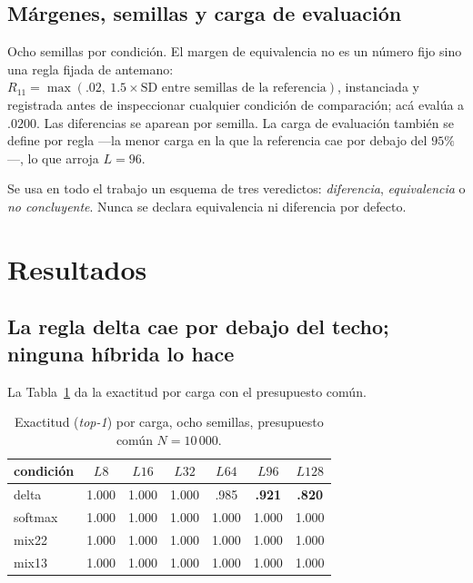 \documentclass[jou,11pt,donotrepeattitle]{apa7}
\begin{document}
\subsection{M\'argenes, semillas y carga de evaluaci\'on}

Ocho semillas por condici\'on. El margen de equivalencia no es un n\'umero fijo sino una regla
fijada de antemano: $R_{11} = \max(.02,\ 1.5\times \text{SD entre semillas de la referencia})$,
instanciada y registrada antes de inspeccionar cualquier condici\'on de comparaci\'on; ac\'a
eval\'ua a $.0200$. Las diferencias se aparean por semilla. La carga de evaluaci\'on tambi\'en
se define por regla ---la menor carga en la que la referencia cae por debajo del $95\%$---, lo
que arroja $L=96$.

Se usa en todo el trabajo un esquema de tres veredictos: \emph{diferencia}, \emph{equivalencia}
o \emph{no concluyente}. Nunca se declara equivalencia ni diferencia por defecto.

\section{Resultados}

\subsection{La regla delta cae por debajo del techo; ninguna h\'ibrida lo hace}

La Tabla~\ref{tab:principal} da la exactitud por carga con el presupuesto com\'un.

\begin{table}[htbp]
\centering
\caption{Exactitud (\emph{top-1}) por carga, ocho semillas, presupuesto com\'un $N=10\,000$.}
\label{tab:principal}
\begin{tabular}{lcccccc}
\toprule
condici\'on & $L8$ & $L16$ & $L32$ & $L64$ & $L96$ & $L128$ \\
\midrule
delta   & 1.000 & 1.000 & 1.000 & .985 & \textbf{.921} & \textbf{.820} \\
softmax & 1.000 & 1.000 & 1.000 & 1.000 & 1.000 & 1.000 \\
mix22   & 1.000 & 1.000 & 1.000 & 1.000 & 1.000 & 1.000 \\
mix13   & 1.000 & 1.000 & 1.000 & 1.000 & 1.000 & 1.000 \\
\bottomrule
\end{tabular}
\end{table}
\end{document}
